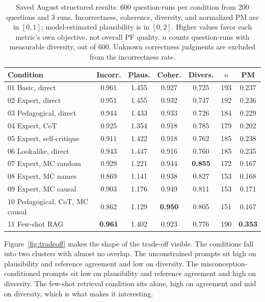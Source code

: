 \begin{table}[h]
\centering
\small
\begin{tabular}{@{}lcccccc@{}}
\toprule
\textbf{Condition} & \textbf{Incorr.} & \textbf{Plaus.} & \textbf{Coher.} & \textbf{Divers.} & \textbf{$n$} & \textbf{PM} \\
\midrule
01 Basic, direct              & 0.961 & 1.455 & 0.927 & 0.725 & 193 & 0.237 \\
02 Expert, direct             & 0.951 & 1.455 & 0.932 & 0.747 & 192 & 0.236 \\
03 Pedagogical, direct        & 0.944 & 1.433 & 0.933 & 0.726 & 184 & 0.229 \\
04 Expert, CoT                & 0.925 & 1.354 & 0.918 & 0.785 & 179 & 0.202 \\
05 Expert, self-critique      & 0.911 & 1.422 & 0.918 & 0.762 & 185 & 0.238 \\
06 Lookalike, direct          & 0.943 & 1.447 & 0.916 & 0.760 & 185 & 0.235 \\
07 Expert, MC random          & 0.929 & 1.221 & 0.944 & \textbf{0.855} & 172 & 0.167 \\
08 Expert, MC names           & 0.869 & 1.141 & 0.938 & 0.827 & 153 & 0.168 \\
09 Expert, MC causal          & 0.903 & 1.176 & 0.949 & 0.811 & 153 & 0.171 \\
10 Pedagogical, CoT, MC causal & 0.862 & 1.129 & \textbf{0.950} & 0.805 & 151 & 0.167 \\
11 Few-shot RAG               & \textbf{0.961} & 1.402 & 0.923 & 0.776 & 190 & \textbf{0.353} \\
\bottomrule
\end{tabular}
\caption{Saved August structured results: 600 question-runs per condition from 200 questions and 3 runs. Incorrectness, coherence, diversity, and normalized PM are in $[0,1]$; model-estimated plausibility is in $[0,2]$. Higher values favor each metric's own objective, not overall PF quality. $n$ counts question-runs with measurable diversity, out of 600. Unknown correctness judgments are excluded from the incorrectness rate.}
\label{tab:mcq-results}
\end{table}

Figure~\ref{fig:tradeoff} makes the shape of the trade-off visible. The conditions fall into two clusters with almost no overlap. The unconstrained prompts sit high on plausibility and reference agreement and low on diversity. The misconception-conditioned prompts sit low on plausibility and reference agreement and high on diversity. The few-shot retrieval condition sits alone, high on agreement and mid on diversity, which is what makes it interesting.

